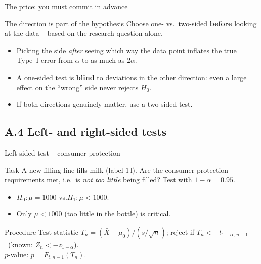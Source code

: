 \documentclass[aspectratio=169,11pt]{beamer}
\begin{document}
\begin{frame}{The price: you must commit in advance}
  \begin{alertblock}{The direction is part of the hypothesis}
    Choose one- vs.\ two-sided \textbf{before} looking at the data -- based on
    the research question alone.
  \end{alertblock}
  \begin{itemize}\setlength{\itemsep}{4pt}
    \item Picking the side \emph{after} seeing which way the data point
          inflates the true Type~I error from $\alpha$ to as much as $2\alpha$.
    \item A one-sided test is \textbf{blind} to deviations in the other
          direction: even a large effect on the ``wrong'' side never rejects
          $H_0$.
    \item If both directions genuinely matter, use a two-sided test.
  \end{itemize}
\end{frame}

\subsection{A.4 Left- and right-sided tests}

\begin{frame}{Left-sided test -- consumer protection}
  \begin{block}{Task}
    A new filling line fills milk (label $1\,\text{l}$). Are the consumer
    protection requirements met, i.e.\ is \emph{not too little} being filled?
    Test with $1-\alpha=0.95$.
  \end{block}
  \begin{itemize}
    \item $H_0:\mu = 1000$ \quad vs.\quad $H_1:\mu < 1000$.
    \item Only $\mu < 1000$ (too little in the bottle) is critical.
  \end{itemize}
  \begin{block}{Procedure}
    Test statistic $T_n = (\bar X - \mu_0)\big/(s/\sqrt n)$; reject if
    $T_n < -t_{1-\alpha,\,n-1}$ \ (known: $Z_n < -z_{1-\alpha}$).\\
    $p$-value: $p = F_{t,n-1}(T_n)$.
  \end{block}
\end{frame}
\end{document}

